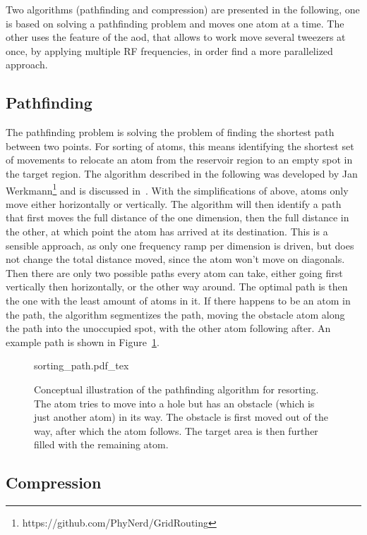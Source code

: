 Two algorithms (pathfinding and compression) are presented in the following, one is based on solving a pathfinding problem and moves one atom at a time. The other uses the feature of the \ac{aod}, that allows to work move several tweezers at once, by applying multiple RF frequencies, in order find a more parallelized approach.


\subsection{Pathfinding}

The pathfinding problem is solving the problem of finding the shortest path between two points. For sorting of atoms, this means identifying the shortest set of movements to relocate an atom from the reservoir region to an empty spot in the target region.
The algorithm described in the following was developed by Jan Werkmann\footnote{https://github.com/PhyNerd/GridRouting} and is discussed in~\cite{OhldeMello2020}. With the simplifications of above, atoms only move either horizontally or vertically. The algorithm will then identify a path that first moves the full distance of the one dimension, then the full distance in the other, at which point the atom has arrived at its destination. This is a sensible approach, as only one frequency ramp per dimension is driven, but does not change the total distance moved, since the atom won't move on diagonals.
Then there are only two possible paths every atom can take, either going first vertically then horizontally, or the other way around. The optimal path is then the one with the least amount of atoms in it. If there happens to be an atom in the path, the algorithm segmentizes the path, moving the obstacle atom along the path into the unoccupied spot, with the other atom following after. An example path is shown in Figure~\ref{fig:sorting_path}.

\begin{figure}[tbp]%
\centering
{sorting_path.pdf_tex}
\caption{Conceptual illustration of the pathfinding algorithm for resorting. The atom tries to move into a hole but has an obstacle (which is just another atom) in its way. The obstacle is first moved out of the way, after which the atom follows. The target area is then further filled with the remaining atom.}%
\label{fig:sorting_path}
\end{figure}

\subsection{Compression}%
\label{sec:compression}

